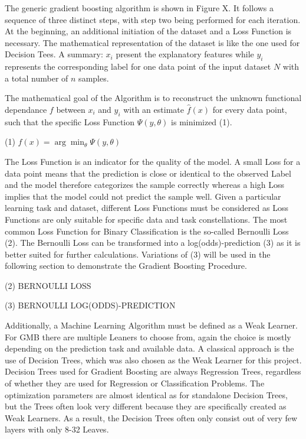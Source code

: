 The generic gradient boosting algorithm is shown in Figure X. It follows a sequence of three 
distinct steps, with step two being performed for each iteration. At the beginning, an 
additional initiation of the dataset and a Loss Function is necessary. The mathematical 
representation of the dataset is like the one used for Decision Tees. A summary: \(x_{i}\) present the 
explanatory features while \(y_{i}\) represents the corresponding label for one data point of the input 
dataset \(N\) with a total number of \(n\) samples. 

The mathematical goal of the Algorithm is to reconstruct the unknown functional dependance \(f\) 
between \(x_{i}\) and \(y_{i}\) with an estimate \(\hat{f} (x)\) for every data point, such that the specific Loss 
Function \(\Psi (y,\theta )\) is minimized (1). 

(1) \(\hat{f} (x) = \arg \min_{\theta } \Psi (y,\theta )\)


The Loss Function is an indicator for the quality of the model. A small Loss for a data point 
means that the prediction is close or identical to the observed Label and the model therefore 
categorizes the sample correctly whereas a high Loss implies that the model could not predict 
the sample well. Given a particular learning task and dataset, different Loss Functions must 
be considered as Loss Functions are only suitable for specific data and task constellations. The most common 
Loss Function for Binary Classification is the so-called Bernoulli Loss (2). The Bernoulli Loss 
can be transformed into a log(odds)-prediction (3) as it is better suited for further calculations. 
Variations of (3) will be used in the following section to demonstrate the Gradient Boosting 
Procedure. 

(2) BERNOULLI LOSS 

(3) BERNOULLI LOG(ODDS)-PREDICTION 

Additionally, a Machine Learning Algorithm must be defined as a Weak Learner. For GMB there 
are multiple Leaners to choose from, again the choice is mostly depending on the prediction 
task and available data. A classical approach is the use of Decision Trees, which was also 
chosen as the Weak Learner for this project. Decision Trees used for Gradient Boosting are 
always Regression Trees, regardless of whether they are used for Regression or Classification 
Problems. The optimization parameters are almost identical as for standalone Decision Trees, 
but the Trees often look very different because they are specifically created as Weak Learners. 
As a result, the Decision Trees often only consist out of very few layers with only 8-32 Leaves.

